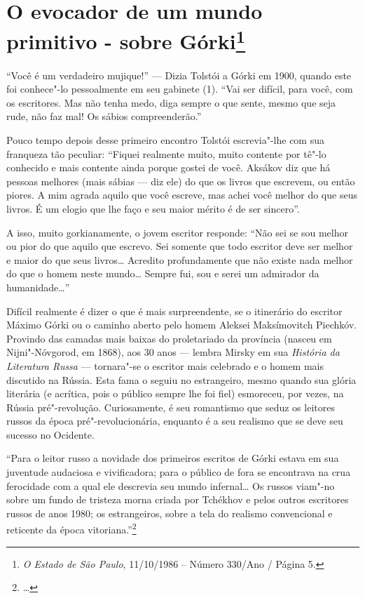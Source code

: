 \chapter{O evocador de um mundo primitivo - sobre Górki\footnote{\emph{O
  Estado de São Paulo}, 11/10/1986 -- Número 330/Ano / Página 5.}}

``Você é um verdadeiro mujique!'' --- Dizia Tolstói a Górki em 1900,
quando este foi conhece"-lo pessoalmente em seu gabinete (1). ``Vai ser
difícil, para você, com os escritores. Mas não tenha medo, diga sempre o
que sente, mesmo que seja rude, não faz mal! Os sábios compreenderão.''

Pouco tempo depois desse primeiro encontro Tolstói escrevia"-lhe com sua
franqueza tão peculiar: ``Fiquei realmente muito, muito contente por
tê"-lo conhecido e mais contente ainda porque gostei de você. Aksákov diz
que há pessoas melhores (mais sábias --- diz ele) do que os livros que
escrevem, ou então piores. A mim agrada aquilo que você escreve, mas
achei você melhor do que seus livros. É um elogio que lhe faço e seu
maior mérito é de ser sincero''.

A isso, muito gorkianamente, o jovem escritor responde: ``Não sei se sou
melhor ou pior do que aquilo que escrevo. Sei somente que todo escritor
deve ser melhor e maior do que seus livros\ldots{} Acredito profundamente que
não existe nada melhor do que o homem neste mundo\ldots{} Sempre fui, sou e
serei um admirador da humanidade\ldots{}''

Difícil realmente é dizer o que é mais surpreendente, se o itinerário do
escritor Máximo Górki ou o caminho aberto pelo homem Aleksei
Maksímovitch Piechkóv. Provindo das camadas mais baixas do proletariado
da província (nasceu em Nijni"-Nóvgorod, em 1868), aos 30 anos --- lembra
 Mirsky em sua \emph{História da Literatura Russa} --- tornara"-se o
escritor mais celebrado e o homem mais discutido na Rússia. Esta fama
o seguiu no estrangeiro, mesmo quando sua glória literária (e
acrítica, pois o público sempre lhe foi fiel) esmoreceu, por vezes, na
Rússia pré"-revolução. Curiosamente, é seu romantismo que seduz os
leitores russos da época pré"-revolucionária, enquanto é a seu realismo
que se deve seu sucesso no Ocidente.

``Para o leitor russo a novidade dos primeiros escritos de Górki estava
em sua juventude audaciosa e vivificadora; para o público de fora se
encontrava na crua ferocidade com a qual ele descrevia seu mundo
infernal\ldots{} Os russos viam"-no sobre um fundo de tristeza morna criada
por Tchékhov e pelos outros escritores russos de anos 1980; os
estrangeiros, sobre a tela do realismo convencional e reticente da época
vitoriana.''\footnote{\ldots{}}

